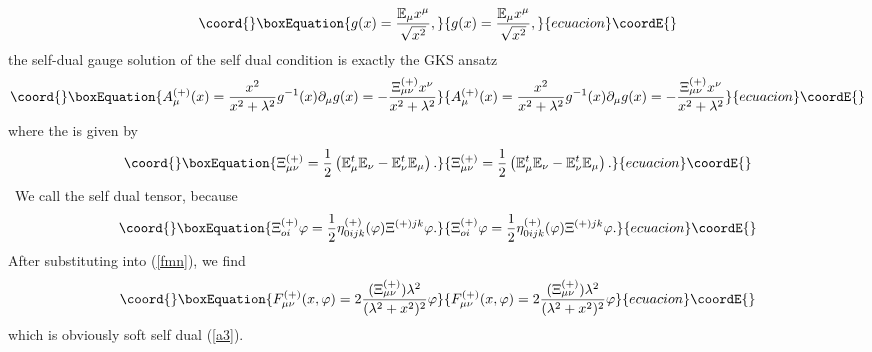 \documentclass[a4paper,12pt]{book}
\begin{document}
\begin{equation}\coord{}\boxEquation{
g(x)=\frac{\Bbb{E}_{\mu }x^{\mu }}{\sqrt{x^{2}}},  \label{gg}
}{
g(x)=\frac{\Bbb{E}_{\mu }x^{\mu }}{\sqrt{x^{2}}},  }{ecuacion}\coordE{}\end{equation}
the self-dual gauge solution of the self dual condition is exactly the GKS
ansatz 
\begin{equation}\coord{}\boxEquation{
A_{\mu }^{(+)}(x)=\frac{x^{2}}{x^{2}+\lambda ^{2}}g^{-1}(x)\partial _{\mu
}g(x)=-\frac{\Xi _{\mu \nu }^{\left( +\right) }x^{\nu }}{x^{2}+\lambda ^{2}}
\label{sol1}
}{
A_{\mu }^{(+)}(x)=\frac{x^{2}}{x^{2}+\lambda ^{2}}g^{-1}(x)\partial _{\mu
}g(x)=-\frac{\Xi _{\mu \nu }^{\left( +\right) }x^{\nu }}{x^{2}+\lambda ^{2}}
}{ecuacion}\coordE{}\end{equation}
where the \myHighlight{$\Xi _{\mu \nu }^{\left( +\right) }$}\coordHE{} is given by 
\begin{equation}\coord{}\boxEquation{
\Xi _{\mu \nu }^{\left( +\right) }=\frac{1}{2}\left( \Bbb{E}_{\mu }^{t}\Bbb{E
}_{\nu }-\Bbb{E}_{\nu }^{t}\Bbb{E}_{\mu }\right) .
}{
\Xi _{\mu \nu }^{\left( +\right) }=\frac{1}{2}\left( \Bbb{E}_{\mu }^{t}\Bbb{E
}_{\nu }-\Bbb{E}_{\nu }^{t}\Bbb{E}_{\mu }\right) .
}{ecuacion}\coordE{}\end{equation}
\ We call \myHighlight{$\Xi _{\mu \nu }^{\left( +\right) }$}\coordHE{} the self dual tensor, because 
\begin{equation}\coord{}\boxEquation{
\Xi _{oi}^{\left( +\right) }\varphi =\frac{1}{2}\eta _{0ijk}^{\left(
+\right) }({\varphi })\Xi ^{\left( +\right) jk}\varphi .
}{
\Xi _{oi}^{\left( +\right) }\varphi =\frac{1}{2}\eta _{0ijk}^{\left(
+\right) }({\varphi })\Xi ^{\left( +\right) jk}\varphi .
}{ecuacion}\coordE{}\end{equation}
After substituting \coordHE{} into (\ref{fmn}), we find 
\begin{equation}\coord{}\boxEquation{
F_{\mu \nu }^{\left( +\right) }(x,{\varphi })=2\frac{(\Xi _{\mu \nu
}^{\left( +\right) })\lambda ^{2}}{(\lambda ^{2}+x^{2})^{2}}\varphi
}{
F_{\mu \nu }^{\left( +\right) }(x,{\varphi })=2\frac{(\Xi _{\mu \nu
}^{\left( +\right) })\lambda ^{2}}{(\lambda ^{2}+x^{2})^{2}}\varphi
}{ecuacion}\coordE{}\end{equation}
which is obviously soft self dual (\ref{a3}).
\end{document}
